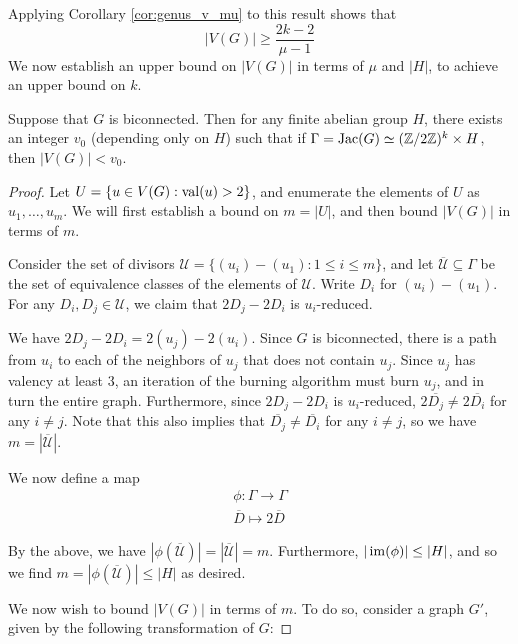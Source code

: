 \documentclass{amsart}
\begin{document}
Applying Corollary \ref{cor:genus_v_mu} to this result shows that 
\begin{equation*}
  |V(G)| \ge \frac{2k-2}{\mu - 1}
\end{equation*}
We now establish an upper bound on $|V(G)|$ in terms of $\mu$ and
$|H|$, to achieve an upper bound on $k$.

\begin{prop}
  \label{prop:v_bound}
  Suppose that $G$ is biconnected. Then for any finite abelian group
  $H$, there exists an integer $v_0$ (depending only on $H$) such that
  if $\Gamma = \operatorname{Jac}(G) \simeq (\mathbb{Z}/2\mathbb{Z})^k \times H$, then $|V(G)| <
  v_0$.
\end{prop}

\begin{proof}
  Let $U = \{u \in V(G) : \operatorname{val}(u) > 2\}$, and enumerate the elements
  of $U$ as $u_1, \ldots, u_m$. We will first establish a bound on
  $m = |U|$, and then bound $|V(G)|$ in terms of $m$.
  
  Consider the set of divisors $\mathcal{U} = \{(u_i) - (u_1) : 1 \le
  i \le m\}$, and let $\overline{\mathcal{U}} \subseteq \Gamma$ be the
  set of equivalence classes of the elements of $\mathcal{U}$. Write
  $D_i$ for $(u_i) - (u_1)$. For any $D_i, D_j \in \mathcal{U}$, we
  claim that $2D_j - 2D_i$ is $u_i$-reduced.

  We have $2D_j - 2D_i = 2(u_j) - 2(u_i)$. Since $G$ is biconnected,
  there is a path from $u_i$ to each of the neighbors of $u_j$ that
  does not contain $u_j$. Since $u_j$ has valency at least $3$, an
  iteration of the burning algorithm must burn $u_j$, and in turn the
  entire graph. Furthermore, since $2D_j - 2D_i$ is $u_i$-reduced,
  $2\overline{D_j} \ne 2\overline{D_i}$ for any $i \ne j$. Note that
  this also implies that $\overline{D_j} \ne \overline{D_i}$ for any
  $i \ne j$, so we have $m=|\overline{\mathcal{U}}|$.

  We now define a map
  \begin{align*}
    \phi: \Gamma \to \Gamma \\
    \overline{D} \mapsto 2\overline{D}
  \end{align*}

  By the above, we have
  $|\phi(\overline{\mathcal{U}})|=|\overline{\mathcal{U}}|=m$. Furthermore,
  $|\operatorname{im}(\phi)| \le |H|$, and so we find
  $m=|\phi(\overline{\mathcal{U}})| \le |H|$ as desired.

  We now wish to bound $|V(G)|$ in terms of $m$. To do so, consider a
  graph $G'$, given by the following transformation of $G$:


\end{proof}
\end{document}
